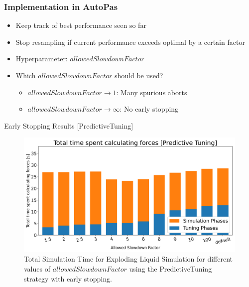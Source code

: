 \documentclass[
	10pt,
	t		%
]{beamer}
\begin{document}
\begin{frame}
    \frametitle{Implementation in AutoPas}

    \begin{itemize}
        \item Keep track of best performance seen so far
        \item Stop resampling if current performance exceeds optimal by a certain factor
        \item Hyperparameter: $allowedSlowdownFactor$

        \item Which $allowedSlowdownFactor$ should be used?
              \begin{itemize}
                  \item $allowedSlowdownFactor \rightarrow 1$: Many spurious aborts
                  \item $allowedSlowdownFactor \rightarrow \infty$: No early stopping
              \end{itemize}
    \end{itemize}
\end{frame}


\begin{frame}{Early Stopping Results [PredictiveTuning]}


    \begin{figure}[H]
        \centering

        \includegraphics[width=\columnwidth]{../../data/explodingLiquid/cluster/predictiveTuning/analytics/total_time_average.png}

        \caption{Total Simulation Time for Exploding Liquid Simulation for different values of $allowedSlowdownFactor$ using the PredictiveTuning strategy with early stopping.}
        \label{fig:predictive_tuning}
    \end{figure}


\end{frame}
\end{document}
